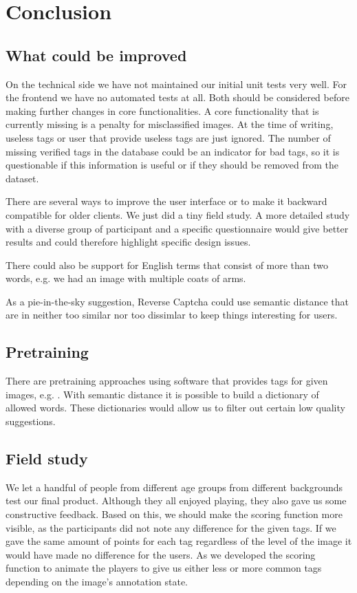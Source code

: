 \section{Conclusion}
\label{gacomphs19:sec:conclusion}

\subsection{What could be improved}
\label{gacomphs19:sec:conclusion:improved}
On the technical side we have not maintained our initial unit tests very well. For the frontend we have no automated tests at all. Both should be considered before making further changes in core functionalities.
A core functionality that is currently missing is a penalty for misclassified images. At the time of writing, useless tags or user that provide useless tags are just ignored. The number of missing verified tags in the database could be an indicator for bad tags, so it is questionable if this information is useful or if they should be removed from the dataset.

There are several ways to improve the user interface or to make it backward compatible for older clients. We just did a tiny field study. A more detailed study with a diverse group of participant and a specific questionnaire would give better results and could therefore highlight specific design issues.

There could also be support for English terms that consist of more than two words, e.g. we had an image with multiple coats of arms.

As a pie-in-the-sky suggestion, Reverse Captcha could use semantic distance that are in neither too similar nor too dissimlar to keep things interesting for users.


\subsection{Pretraining}
\label{gacomphs19:sec:conclusion:pretraining}
There are pretraining approaches using software that provides tags for given images, e.g. \cite{simonyan2014very}. With semantic distance it is possible to build a dictionary of allowed words. These dictionaries would allow us to filter out certain low quality suggestions.

\subsection{Field study}
\label{gacomphs19:sec:conclusion:fieldstudy}
We let a handful of people from different age  groups from different backgrounds test our final product.
Although they all enjoyed playing, they also gave us some constructive feedback.
Based on this, we should make the scoring function more visible, as the participants did not note any difference for the given tags.
If we gave the same amount of points for each tag regardless of the level of the image it would have made no difference for the users.
As we developed the scoring function to animate the players to give us either less or more common tags depending on the image's annotation state.

